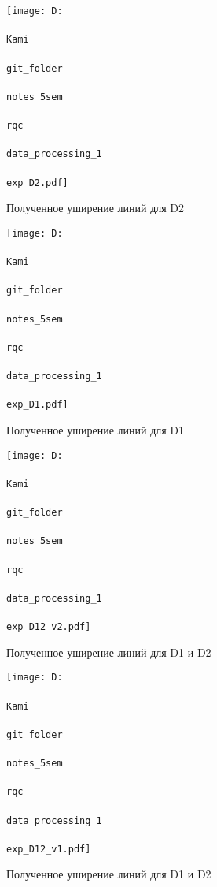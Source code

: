 


\begin{figure}[h]
    \centering
    \texttt{[image: D:\\\\Kami\\\\git\_folder\\\\notes\_5sem\\\\rqc\\\\data\_processing\_1\\\\exp\_D2.pdf]}
    \caption{Полученное уширение линий для D2}
    \label{fig:expD2}
\end{figure}


\begin{figure}[h]
    \centering
    \texttt{[image: D:\\\\Kami\\\\git\_folder\\\\notes\_5sem\\\\rqc\\\\data\_processing\_1\\\\exp\_D1.pdf]}
    \caption{Полученное уширение линий для D1}
    \label{fig:expD1}
\end{figure}


\begin{figure}[h!]
    \centering
    \texttt{[image: D:\\\\Kami\\\\git\_folder\\\\notes\_5sem\\\\rqc\\\\data\_processing\_1\\\\exp\_D12\_v2.pdf]}
    \caption{Полученное уширение линий для D1 и D2}
    \label{fig:expD12}
\end{figure}


\begin{figure}[ht]
    \centering
    \texttt{[image: D:\\\\Kami\\\\git\_folder\\\\notes\_5sem\\\\rqc\\\\data\_processing\_1\\\\exp\_D12\_v1.pdf]}
    \caption{Полученное уширение линий для D1 и D2}
    \label{fig:expD12}
\end{figure}
